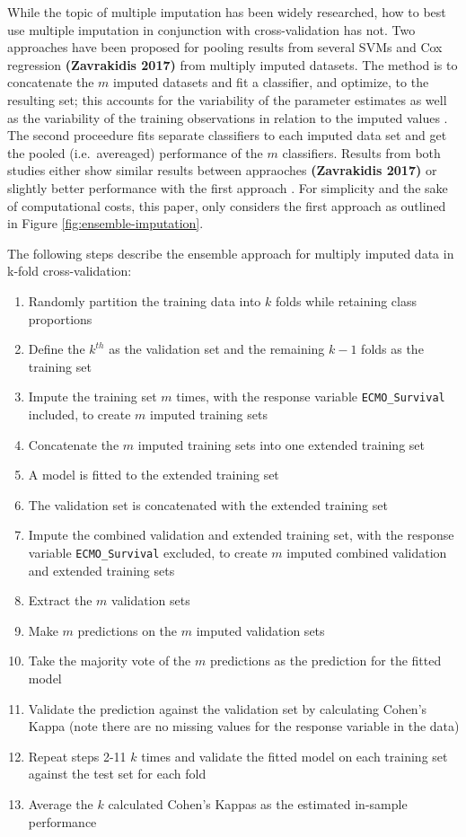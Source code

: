 \documentclass[12pt,]{article}
\providecommand{\tightlist}{%
  \setlength{\itemsep}{0pt}\setlength{\parskip}{0pt}}
\begin{document}
While the topic of multiple imputation has been widely researched, how
to best use multiple imputation in conjunction with cross-validation has
not. Two approaches have been proposed for pooling results from several
SVMs \autocite{belanche_handling_2014} and Cox regression
\textbf{(Zavrakidis 2017)} from multiply imputed datasets. The method is
to concatenate the \(m\) imputed datasets and fit a classifier, and
optimize, to the resulting set; this accounts for the variability of the
parameter estimates as well as the variability of the training
observations in relation to the imputed values
\autocite{belanche_handling_2014}. The second proceedure fits separate
classifiers to each imputed data set and get the pooled (i.e.~avereaged)
performance of the \(m\) classifiers. Results from both studies either
show similar results between appraoches \textbf{(Zavrakidis 2017)} or
slightly better performance with the first approach
\autocite{belanche_handling_2014}. For simplicity and the sake of
computational costs, this paper, only considers the first approach as
outlined in Figure \ref{fig:ensemble-imputation}.

The following steps describe the ensemble approach for multiply imputed
data in k-fold cross-validation:

\begin{enumerate}
\def\labelenumi{\arabic{enumi}.}
\tightlist
\item
  Randomly partition the training data into \(k\) folds while retaining
  class proportions
\item
  Define the \(k^{th}\) as the validation set and the remaining \(k-1\)
  folds as the training set
\item
  Impute the training set \(m\) times, with the response variable
  \texttt{ECMO\_Survival} included, to create \(m\) imputed training
  sets
\item
  Concatenate the \(m\) imputed training sets into one extended training
  set
\item
  A model is fitted to the extended training set
\item
  The validation set is concatenated with the extended training set
\item
  Impute the combined validation and extended training set, with the
  response variable \texttt{ECMO\_Survival} excluded, to create \(m\)
  imputed combined validation and extended training sets
\item
  Extract the \(m\) validation sets
\item
  Make \(m\) predictions on the \(m\) imputed validation sets
\item
  Take the majority vote of the \(m\) predictions as the prediction for
  the fitted model
\item
  Validate the prediction against the validation set by calculating
  Cohen's Kappa (note there are no missing values for the response
  variable in the data)
\item
  Repeat steps 2-11 \(k\) times and validate the fitted model on each
  training set against the test set for each fold
\item
  Average the \(k\) calculated Cohen's Kappas as the estimated in-sample
  performance
\end{enumerate}
\end{document}
